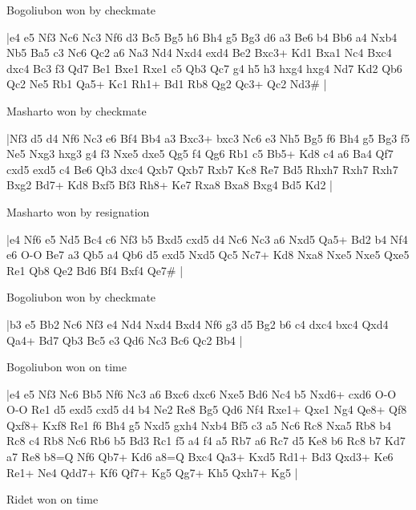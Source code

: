 \showboard

Bogoliubon won by checkmate

\makegametitle
|e4 e5 Nf3 Nc6 Nc3 Nf6 d3 Bc5 Bg5 h6 Bh4 g5 Bg3 d6 a3 Be6 b4 Bb6 a4 Nxb4 Nb5 Ba5 c3 Nc6 Qc2 a6 Na3 Nd4 Nxd4 exd4 Be2 Bxc3+ Kd1 Bxa1 Nc4 Bxc4 dxc4 Bc3 f3 Qd7 Be1 Bxe1 Rxe1 c5 Qb3 Qc7 g4 h5 h3 hxg4 hxg4 Nd7 Kd2 Qb6 Qc2 Ne5 Rb1 Qa5+ Kc1 Rh1+ Bd1 Rb8 Qg2 Qc3+ Qc2 Nd3\#  |

\showboard

Masharto won by checkmate

\makegametitle
|Nf3 d5 d4 Nf6 Nc3 e6 Bf4 Bb4 a3 Bxc3+ bxc3 Nc6 e3 Nh5 Bg5 f6 Bh4 g5 Bg3 f5 Ne5 Nxg3 hxg3 g4 f3 Nxe5 dxe5 Qg5 f4 Qg6 Rb1 c5 Bb5+ Kd8 c4 a6 Ba4 Qf7 cxd5 exd5 c4 Be6 Qb3 dxc4 Qxb7 Qxb7 Rxb7 Kc8 Re7 Bd5 Rhxh7 Rxh7 Rxh7 Bxg2 Bd7+ Kd8 Bxf5 Bf3 Rh8+ Ke7 Rxa8 Bxa8 Bxg4 Bd5 Kd2  |

\showboard

Masharto won by resignation

\makegametitle
|e4 Nf6 e5 Nd5 Bc4 c6 Nf3 b5 Bxd5 cxd5 d4 Nc6 Nc3 a6 Nxd5 Qa5+ Bd2 b4 Nf4 e6 O-O Be7 a3 Qb5 a4 Qb6 d5 exd5 Nxd5 Qc5 Nc7+ Kd8 Nxa8 Nxe5 Nxe5 Qxe5 Re1 Qb8 Qe2 Bd6 Bf4 Bxf4 Qe7\#  |

\showboard

Bogoliubon won by checkmate

\makegametitle
|b3 e5 Bb2 Nc6 Nf3 e4 Nd4 Nxd4 Bxd4 Nf6 g3 d5 Bg2 b6 c4 dxc4 bxc4 Qxd4 Qa4+ Bd7 Qb3 Bc5 e3 Qd6 Nc3 Bc6 Qc2 Bb4  |

\showboard

Bogoliubon won on time

\makegametitle
|e4 e5 Nf3 Nc6 Bb5 Nf6 Nc3 a6 Bxc6 dxc6 Nxe5 Bd6 Nc4 b5 Nxd6+ cxd6 O-O O-O Re1 d5 exd5 cxd5 d4 b4 Ne2 Re8 Bg5 Qd6 Nf4 Rxe1+ Qxe1 Ng4 Qe8+ Qf8 Qxf8+ Kxf8 Re1 f6 Bh4 g5 Nxd5 gxh4 Nxb4 Bf5 c3 a5 Nc6 Rc8 Nxa5 Rb8 b4 Rc8 c4 Rb8 Nc6 Rb6 b5 Bd3 Rc1 f5 a4 f4 a5 Rb7 a6 Rc7 d5 Ke8 b6 Rc8 b7 Kd7 a7 Re8 b8=Q Nf6 Qb7+ Kd6 a8=Q Bxc4 Qa3+ Kxd5 Rd1+ Bd3 Qxd3+ Ke6 Re1+ Ne4 Qdd7+ Kf6 Qf7+ Kg5 Qg7+ Kh5 Qxh7+ Kg5  |

\showboard

Ridet won on time

